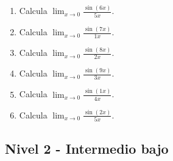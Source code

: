 \documentclass[11pt,a4paper]{article}
\begin{document}
\begin{enumerate}[label=\textbf{E\arabic*.},start=401]
\item Calcula $\displaystyle\lim_{x\to0}\frac{\sin(6x)}{5x}$.

\item Calcula $\displaystyle\lim_{x\to0}\frac{\sin(7x)}{1x}$.

\item Calcula $\displaystyle\lim_{x\to0}\frac{\sin(8x)}{2x}$.

\item Calcula $\displaystyle\lim_{x\to0}\frac{\sin(9x)}{3x}$.

\item Calcula $\displaystyle\lim_{x\to0}\frac{\sin(1x)}{4x}$.

\item Calcula $\displaystyle\lim_{x\to0}\frac{\sin(2x)}{5x}$.

\end{enumerate}

\subsection{Nivel 2 - Intermedio bajo}
\end{document}
